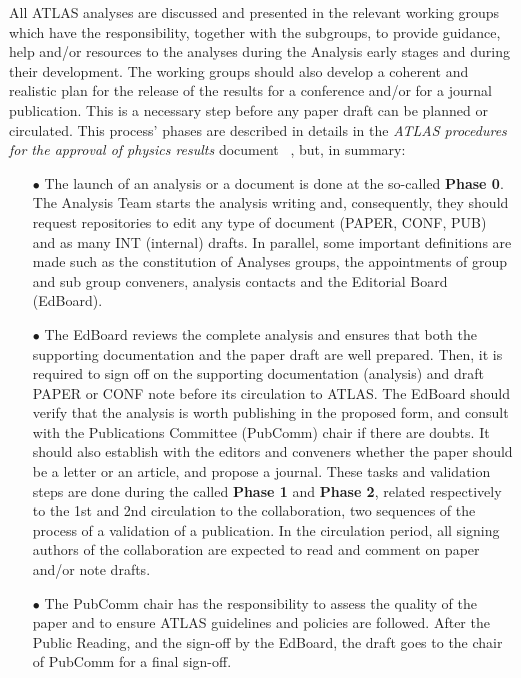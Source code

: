 All ATLAS analyses are discussed and presented in the relevant working groups  which have the responsibility, together with the subgroups, to provide guidance, help and/or resources to the analyses during the Analysis early stages and during their development. The working groups should also develop a coherent and realistic plan for the release of the results for a conference and/or for a journal publication. This is a necessary step before any paper draft can be planned or circulated. This process' phases are described in details in the \textit{ATLAS procedures for the approval of physics results} document ~\cite{Pub-policy}, but, in summary:

\begin{itemize}

    \item[$\bullet$] The launch of an analysis or a document is done at the so-called \textbf{Phase 0}. The Analysis Team starts the analysis writing and, consequently, they should request repositories to edit any type of document (PAPER, CONF, PUB) and as many INT (internal) drafts. In parallel, some important definitions are made such as the constitution of Analyses groups, the appointments of group and sub group conveners, analysis contacts and the Editorial Board (EdBoard).
    
    \item[$\bullet$] The EdBoard reviews the complete analysis and ensures that both the supporting documentation and the paper draft are well prepared. Then, it is required to sign off on the supporting documentation (analysis) and draft PAPER or CONF note before its circulation to ATLAS. The EdBoard should verify that the analysis is worth publishing in the proposed form, and consult with the Publications Committee (PubComm) chair if there are doubts. It should also establish with the editors and conveners whether the paper should be a letter or an article, and propose a journal. These tasks and validation steps are done during the called \textbf{Phase 1} and \textbf{Phase 2}, related respectively to the 1st and 2nd circulation to the collaboration, two sequences of the process of a validation of a publication. In the circulation period, all signing authors of the collaboration are expected to read and comment on paper and/or note drafts.
    
    \item[$\bullet$] The PubComm chair has the responsibility to assess the quality of the paper and to ensure ATLAS guidelines and policies are followed. After the Public Reading, and the sign-off by the EdBoard, the draft goes to the chair of PubComm for a final sign-off.
    

\end{itemize}

